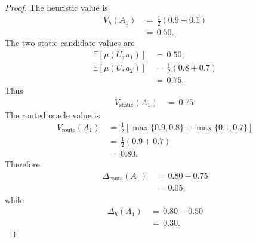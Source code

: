 \documentclass{article} %
\begin{document}
\begin{proof}
The heuristic value is
\begin{align}
\label{eq:app-fourth-heur-ex-proof-vh}
V_h(A_1)
&\,=\,
\frac{1}{2}(0.9+0.1)
\\
&\,=\,
0.50.
\end{align}
The two static candidate values are
\begin{align}
\label{eq:app-fourth-heur-ex-proof-static-values}
\mathbb{E}[\mu(U,a_1)]
&\,=\,
0.50,
\\
\mathbb{E}[\mu(U,a_2)]
&\,=\,
\frac{1}{2}(0.8+0.7)
\\
&\,=\,
0.75.
\end{align}
Thus
\begin{align}
\label{eq:app-fourth-heur-ex-proof-vstatic}
V_{\mathrm{static}}(A_1)
&\,=\,
0.75.
\end{align}
The routed oracle value is
\begin{align}
\label{eq:app-fourth-heur-ex-proof-vroute}
V_{\mathrm{route}}(A_1)
&\,=\,
\frac{1}{2}
\left[
\max\{0.9,0.8\}
+
\max\{0.1,0.7\}
\right]
\\
&\,=\,
\frac{1}{2}(0.9+0.7)
\\
&\,=\,
0.80.
\end{align}
Therefore
\begin{align}
\label{eq:app-fourth-heur-ex-proof-true}
\Delta_{\mathrm{route}}(A_1)
&\,=\,
0.80-0.75
\\
&\,=\,
0.05,
\end{align}
while
\begin{align}
\label{eq:app-fourth-heur-ex-proof-bad}
\Delta_h(A_1)
&\,=\,
0.80-0.50
\\
&\,=\,
0.30.
\end{align}
\end{proof}
\end{document}
